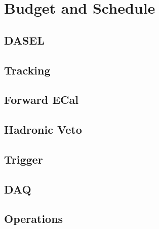 \section{Budget and Schedule}

\subsection{DASEL}

\subsection{Tracking}

\subsection{Forward ECal}

\subsection{Hadronic Veto}

\subsection{Trigger}

\subsection{DAQ}

\subsection{Operations}

